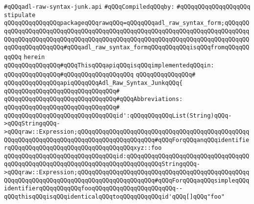 \label{src/lib/compiler/back/low/tools/adl-syntax/adl-raw-syntax-junk.api}
\verb|#qQQqadl-raw-syntax-junk.api|\newline
\newline
\verb|#qQQqCompiledqQQqby:|\newline
\verb|#qQQqqQQqqQQqqQQqqQQq|\newline
\newline
\newline
\verb|stipulate|\newline
\verb|qQQqqQQqqQQqqQQqpackageqQQqrawqQQq=qQQqqQQqadl_raw_syntax_form;qQQqqQQqqQQqqQQqqQQqqQQqqQQqqQQqqQQqqQQqqQQqqQQqqQQqqQQqqQQqqQQqqQQqqQQqqQQqqQQqqQQqqQQqqQQqqQQqqQQqqQQqqQQqqQQqqQQqqQQqqQQqqQQqqQQqqQQqqQQqqQQqqQQqqQQqqQQqqQQqqQQq#qQQqadl_raw_syntax_formqQQqqQQqqQQqisqQQqfromqQQqqQQqqQQq|\newline
\verb|herein|\newline
\newline
\verb|qQQqqQQqqQQqqQQq#qQQqThisqQQqapiqQQqisqQQqimplementedqQQqin:|\newline
\verb|qQQqqQQqqQQqqQQq#qQQqqQQqqQQqqQQqqQQq|\newline
\verb|qQQqqQQqqQQqqQQq#|\newline
\verb|qQQqqQQqqQQqqQQqapiqQQqqQQqAdl_Raw_Syntax_JunkqQQq{|\newline
\verb|qQQqqQQqqQQqqQQqqQQqqQQqqQQqqQQq#|\newline
\newline
\verb|qQQqqQQqqQQqqQQqqQQqqQQqqQQqqQQq#qQQqAbbreviations:|\newline
\verb|qQQqqQQqqQQqqQQqqQQqqQQqqQQqqQQq#|\newline
\verb|qQQqqQQqqQQqqQQqqQQqqQQqqQQqqQQqid':qQQqqQQqqQQqList(String)qQQq->qQQqStringqQQq->qQQqraw::Expression;qQQqqQQqqQQqqQQqqQQqqQQqqQQqqQQqqQQqqQQqqQQqqQQqqQQqqQQqqQQqqQQqqQQqqQQqqQQqqQQqqQQqqQQqqQQq#qQQqForqQQqanqQQqidentifierqQQqqQQqqQQqqQQqqQQqqQQqqQQqqQQqqQQqxyz::foo|\newline
\verb|qQQqqQQqqQQqqQQqqQQqqQQqqQQqqQQqid:qQQqqQQqqQQqqQQqqQQqqQQqqQQqqQQqqQQqqQQqqQQqqQQqqQQqqQQqqQQqqQQqqQQqqQQqqQQqqQQqStringqQQq->qQQqraw::Expression;qQQqqQQqqQQqqQQqqQQqqQQqqQQqqQQqqQQqqQQqqQQqqQQqqQQqqQQqqQQqqQQqqQQqqQQqqQQqqQQqqQQqqQQqqQQq#qQQqForqQQqaqQQqsimpleqQQqidentifierqQQqqQQqqQQqfooqQQqqQQqqQQqqQQqqQQqqQQq--qQQqthisqQQqisqQQqidenticalqQQqtoqQQqqQQqqQQqid'qQQq[]qQQq"foo"|\newline
